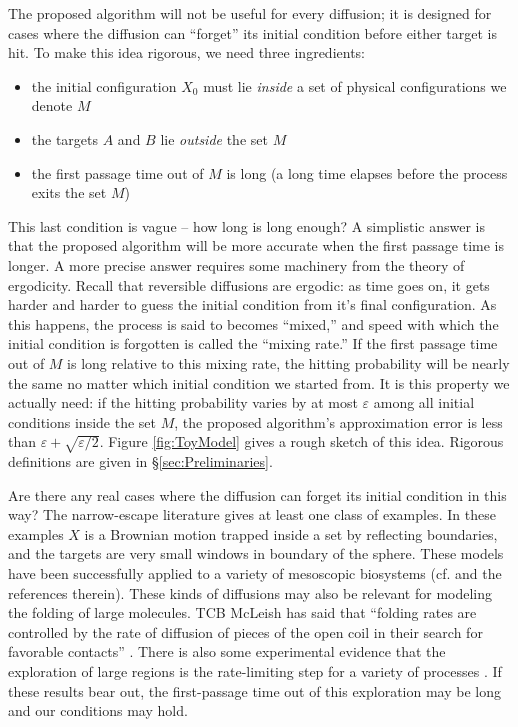 \documentclass[12pt, nofootinbib,english, amsmath, amssymb, aps, priprint, graphicx,floatfix]{revtex4-1}
\theoremstyle{plain}
\theoremstyle{definition}
\theoremstyle{plain}
\begin{document}
The proposed algorithm will not be useful for every diffusion; it is designed for cases where the diffusion can ``forget'' its initial condition before either target is hit.  To make this idea rigorous, we need three ingredients:
\begin{itemize}
    \item the initial configuration $X_0$ must lie \emph{inside} a set of physical configurations we denote $M$
    \item the targets $A$ and $B$ lie \emph{outside} the set $M$
    \item the first passage time out of $M$ is long (a long time elapses before the process exits the set $M$)
\end{itemize}
This last condition is vague -- how long is long enough?  A simplistic answer is that the proposed algorithm will be more accurate when the first passage time is longer.  A more precise answer requires some machinery from the theory of ergodicity.  Recall that reversible diffusions are ergodic: as time goes on, it gets harder and harder to guess the initial condition from it's final configuration.  As this happens, the process is said to becomes ``mixed,'' and speed with which the initial condition is forgotten is called the ``mixing rate.''  If the first passage time out of $M$ is long relative to this mixing rate, the hitting probability will be nearly the same no matter which initial condition we started from.  It is this property we actually need: if the hitting probability varies by at most $\varepsilon$ among all initial conditions inside the set $M$, the proposed algorithm's approximation error is less than $\varepsilon + \sqrt{\varepsilon/2}$.  Figure \ref{fig:ToyModel} gives a rough sketch of this idea.  Rigorous definitions are given in  \S\ref{sec:Preliminaries}.  

Are there any real cases where the diffusion can forget its initial condition in this way?  The narrow-escape literature gives at least one class of examples.  In these examples $X$ is a Brownian motion trapped inside a set by reflecting boundaries, and the targets are very small windows in boundary of the sphere.  These models have been successfully applied to a variety of mesoscopic biosystems (cf. \cite{schuss2007narrow} and the references therein).  These kinds of diffusions may also be relevant for modeling the folding of large molecules.  TCB McLeish has said that ``folding rates are controlled by the rate of diffusion of pieces of the open coil in their search for favorable contacts'' \cite{McLeish2005-dq}.  There is also some experimental evidence that the exploration of large regions is the rate-limiting step for a variety of processes \cite{Goldberg1999-mv,Jacob1999-bs,Plaxco1998-iv,Wales2006-ur}.  If these results bear out, the first-passage time out of this exploration may be long and our conditions may hold. 
\end{document}

